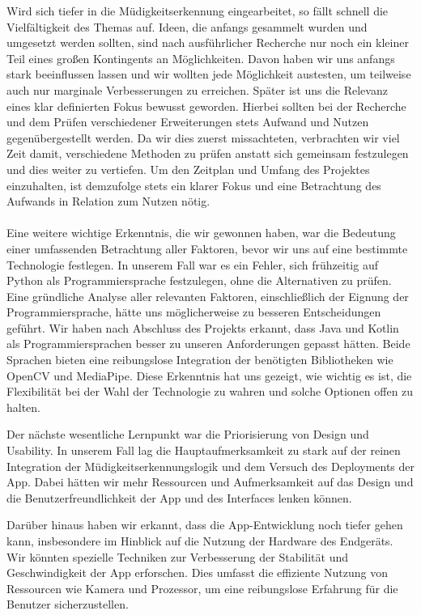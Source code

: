 Wird sich tiefer in die Müdigkeitserkennung eingearbeitet, so fällt schnell die Vielfältigkeit des Themas auf. Ideen, die anfangs gesammelt wurden und umgesetzt werden sollten, sind nach ausführlicher Recherche nur noch ein kleiner Teil eines großen Kontingents an Möglichkeiten. Davon haben wir uns anfangs stark beeinflussen lassen und wir wollten jede Möglichkeit austesten, um teilweise auch nur marginale Verbesserungen zu erreichen. Später ist uns die Relevanz eines klar definierten Fokus bewusst geworden. Hierbei sollten bei der Recherche und dem Prüfen verschiedener Erweiterungen stets Aufwand und Nutzen gegenübergestellt werden. Da wir dies zuerst missachteten, verbrachten wir viel Zeit damit, verschiedene Methoden zu prüfen anstatt sich gemeinsam festzulegen und dies weiter zu vertiefen. Um den Zeitplan und Umfang des Projektes einzuhalten, ist demzufolge stets ein klarer Fokus und eine Betrachtung des Aufwands in Relation zum Nutzen nötig.
\\\\
Eine weitere wichtige Erkenntnis, die wir gewonnen haben, war die Bedeutung einer umfassenden Betrachtung aller Faktoren, bevor wir uns auf eine bestimmte Technologie festlegen. In unserem Fall war es ein Fehler, sich frühzeitig auf Python als Programmiersprache festzulegen, ohne die Alternativen zu prüfen. Eine gründliche Analyse aller relevanten Faktoren, einschließlich der Eignung der Programmiersprache, hätte uns möglicherweise zu besseren Entscheidungen geführt. Wir haben nach Abschluss des Projekts erkannt, dass Java und Kotlin als Programmiersprachen besser zu unseren Anforderungen gepasst hätten. Beide Sprachen bieten eine reibungslose Integration der benötigten Bibliotheken wie OpenCV und MediaPipe. Diese Erkenntnis hat uns gezeigt, wie wichtig es ist, die Flexibilität bei der Wahl der Technologie zu wahren und solche Optionen offen zu halten.

Der nächste wesentliche Lernpunkt war die Priorisierung von Design und Usability. In unserem Fall lag die Hauptaufmerksamkeit zu stark auf der reinen Integration der Müdigkeitserkennungslogik und dem Versuch des Deployments der App. Dabei hätten wir mehr Ressourcen und Aufmerksamkeit auf das Design und die Benutzerfreundlichkeit der App und des Interfaces lenken können. 

Darüber hinaus haben wir erkannt, dass die App-Entwicklung noch tiefer gehen kann, insbesondere im Hinblick auf die Nutzung der Hardware des Endgeräts. Wir könnten spezielle Techniken zur Verbesserung der Stabilität und Geschwindigkeit der App erforschen. Dies umfasst die effiziente Nutzung von Ressourcen wie Kamera und Prozessor, um eine reibungslose Erfahrung für die Benutzer sicherzustellen.

